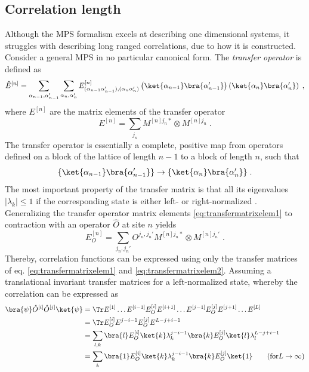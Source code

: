 \subsection{Correlation length} \label{sec:CorrelationLength}
Although the MPS formalism excels at describing one dimensional systems, it struggles with describing long ranged correlations, due to how it is constructed.
Consider a general MPS in no particular canonical form. The \textit{transfer operator} is defined as
\begin{equation}
	\hat{E}^{[n]} = \sum_{\alpha_{n-1}, \alpha_{n-1}'} \sum_{\alpha_{n}, \alpha_{n}'} E_{(\alpha_{n-1} \alpha_{n-1}'),(\alpha_{n}  \alpha_{n}')}^{[n]} \left( \ket{\alpha_{n-1}}\bra{\alpha_{n-1}'} \right) \left( \ket{\alpha_{n}}\bra{\alpha_{n}'} \right) \; ,
\end{equation}   
where $E^{[n]}$ are the matrix elements of the transfer operator
\begin{equation}
	E^{[n]} = \sum_{j_n} M^{[n] j_n *} \otimes M^{[n] j_n}  \; . \label{eq:transfermatrixelem1}
\end{equation}
The transfer operator is essentially a complete, positive map from operators defined on a block of the lattice of length $n-1$ to a block of length $n$, such that
\begin{equation}
	\{ \ket{\alpha_{n-1}}\bra{\alpha_{n-1}'} \} \to \{ \ket{\alpha_{n}}\bra{\alpha_{n}'} \} \; .
\end{equation}
The most important property of the transfer matrix is that all its eigenvalues $|\lambda_k| \leq 1 $ if the corresponding state is either left- or right-normalized \cite{schollwock}. \\
Generalizing the transfer operator matrix elements \eqref{eq:transfermatrixelem1} to contraction with an operator $\hat{O}$ at site $n$ yields 
\begin{equation}
	E_{O}^{[n]} = \sum_{j_n , j_n '} O^{j_n , j_n '} M^{[n] j_n *} \otimes  M^{[n] j_n '} \; . \label{eq:transfermatrixelem2}
\end{equation}
Thereby, correlation functions can be expressed using only the transfer matrices of eq. \eqref{eq:transfermatrixelem1} and \eqref{eq:transfermatrixelem2}. Assuming a translational invariant transfer matrices for a left-normalized state, whereby the correlation can be expressed as  
\begin{align}
	\bra{\psi} \hat{O}^{[i]} \hat{O}^{[j]} \ket{\psi} &= \Tr E^{[1]} \ldots E^{[i-1]} E_{O}^{[i]} E^{[i+1]} \ldots E^{[j-1]} E_{O}^{[j]} E^{[j+1]} \ldots E^{[L]} \nonumber \\
	&= \Tr E_{O}^{[i]} E^{j-i-1} E_{O}^{[j]} E^{L-j+i-1} \nonumber \\ 
	&= \sum_{l , k} \bra{l} E_{O}^{[i]} \ket{k} \lambda_{k}^{j-i-1} \bra{k} E_{O}^{[j]} \ket{l} \lambda_{l}^{L-j+i-1} \nonumber \\ 
	&= \sum_{k} \bra{1} E_{O}^{[i]} \ket{k} \lambda_{k}^{j-i-1} \bra{k} E_{O}^{[j]} \ket{1} \qquad (\mathrm{for } L \to \infty)
\end{align}
